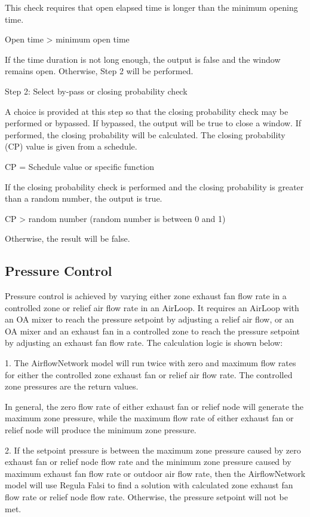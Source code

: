 This check requires that open elapsed time is longer than the minimum opening time.

Open time \textgreater{} minimum open time

If the time duration is not long enough, the output is false and the window remains open. Otherwise, Step 2 will be performed.

Step 2: Select by-pass or closing probability check

A choice is provided at this step so that the closing probability check may be performed or bypassed. If bypassed, the output will be true to close a window. If performed, the closing probability will be calculated. The closing probability (CP) value is given from a schedule.

CP = Schedule value or specific function

If the closing probability check is performed and the closing probability is greater than a random number, the output is true.

CP \textgreater{} random number (random number is between 0 and 1)

Otherwise, the result will be false.

\subsection{Pressure Control}\label{pressure-control}

Pressure control is achieved by varying either zone exhaust fan flow rate in a controlled zone or relief air flow rate in an AirLoop. It requires an AirLoop with an OA mixer to reach the pressure setpoint by adjusting a relief air flow, or an OA mixer and an exhaust fan in a controlled zone to reach the pressure setpoint by adjusting an exhaust fan flow rate. The calculation logic is shown below:

1. The AirflowNetwork model will run twice with zero and maximum flow rates for either the controlled zone exhaust fan or relief air flow rate. The controlled zone pressures are the return values.

	In general, the zero flow rate of either exhaust fan or relief node will generate the maximum zone pressure, while the maximum flow rate of either exhaust fan or relief node will produce the minimum zone pressure. 

2. If the setpoint pressure is between the maximum zone pressure caused by zero exhaust fan or relief node flow rate and the minimum zone pressure caused by maximum exhaust fan flow rate or outdoor air flow rate, then the AirflowNetwork model will use Regula Falsi to find a solution with calculated zone exhaust fan flow rate or relief node flow rate. Otherwise, the pressure setpoint will not be met. 

